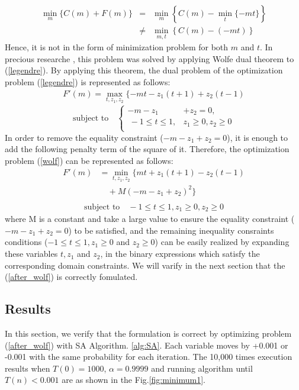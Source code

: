 \documentclass[fp,twocolumn]{jpsj3}
\begin{document}
\begin{eqnarray}
  \min_{m}{\{C(m)+F(m)\}} &=& \min_{m}\left\{C(m)-\min_{t}{\{-mt\}}\right\} \nonumber \\
  &\neq & \min_{m,t}{\left\{C(m)-(-mt)\right\}} \nonumber 
\end{eqnarray}
Hence, it is not in the form of minimization problem for both $m$ and $t$.
In precious researche \cite{relu}, this problem was solved by applying Wolfe dual theorem to (\ref{legendre}). By applying this theorem, the dual problem of the optimization problem (\ref{legendre}) is represented as follows:
\begin{eqnarray}
  F'(m)=\max_{t,z_{1},z_{2}}{\{-mt-z_{1}(t+1)+z_{2}(t-1)} \label{wolf}
\end{eqnarray}
\begin{equation}
  \text{subject to} \quad \left\{
  \begin{aligned}
   -m-z_{1}&+z_{2}=0, \nonumber \\
   \ -1\leq t\leq 1,& z_{1}\geq 0, z_{2}\geq 0 \nonumber \\
  \end{aligned}
  \right.
\end{equation}
In order to remove the equality constraint ($-m-z_{1}+z_{2}=0$), it is enough to add the following penalty term of the square of it. Therefore, the optimization problem (\ref{wolf}) can be represented as follows:
\begin{equation}
  \begin{aligned}
    F'(m)&=\min_{t,z_{1},z_{2}}{\{mt+z_{1}(t+1)-z_{2}(t-1)} \\
    &\quad+M(-m-z_{1}+z_{2})^{2}\} \label{after_wolf} \\
  \end{aligned}
\end{equation}
\begin{eqnarray}
  \text{subject to} \quad -1\leq t\leq 1, z_{1}\geq 0, z_{2}\geq 0 \nonumber
  \end{eqnarray}
where M is a constant and take a large value to ensure the equality constraint ($-m-z_{1}+z_{2}=0$) to be satisfied, and the remaining inequality consraints conditions ($-1\leq t\leq 1, z_{1}\geq 0$ and $z_{2}\geq 0$) can be easily realized by expanding these variables $t,z_{1}$ and $z_{2}$, in the binary expressions which satisfy the corresponding domain constraints. We will varify in the next section that the (\ref{after_wolf}) is correctly fomulated. 

\subsection{Results} \label{experiment_condition} %
In this section, we verify that the formulation is correct by optimizing problem (\ref{after_wolf}) with SA Algorithm. \ref{alg:SA}. Each variable moves by +0.001 or -0.001 with the same probability for each iteration. The 10,000 times execution results when $T(0)=1000$, $\alpha=0.9999$ and running algorithm until $T(n)<0.001$ are as shown in the Fig.\ref{fig:minimum1}.
\end{document}
